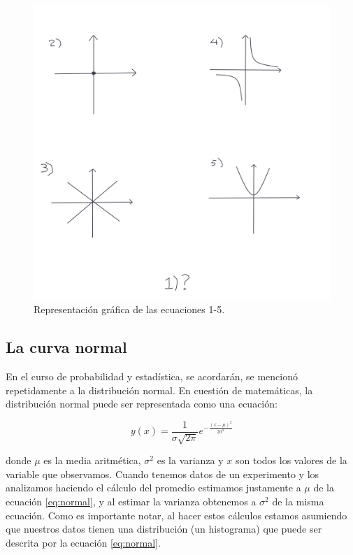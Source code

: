 \documentclass[
]{book}
\begin{document}
\begin{figure}

{\centering \includegraphics[width=6.93in]{Unidad-I/conicas} 

}

\caption{Representación gráfica de las ecuaciones 1-5.}\label{fig:conicas}
\end{figure}

\hypertarget{la-curva-normal}{%
\subsection{La curva normal}\label{la-curva-normal}}

En el curso de probabilidad y estadística, se acordarán, se mencionó repetidamente a la distribución normal. En cuestión de matemáticas, la distribución normal puede ser representada como una ecuación:

\begin{equation}
    y(x) = \frac{1}{\sigma \sqrt{2\pi}}e^{-\frac{(x-\mu)^2}{2\sigma^2}} \label{eq:normal}
\end{equation}

donde \(\mu\) es la media aritmética, \(\sigma^2\) es la varianza y \(x\) son todos los valores de la variable que observamos. Cuando tenemos datos de un experimento y los analizamos haciendo el cálculo del promedio estimamos justamente a \(\mu\) de la ecuación \eqref{eq:normal}, y al estimar la varianza obtenemos a \(\sigma^2\) de la misma ecuación. Como es importante notar, al hacer estos cálculos estamos asumiendo que nuestros datos tienen una distribución (un histograma) que puede ser descrita por la ecuación \eqref{eq:normal}.
\end{document}
